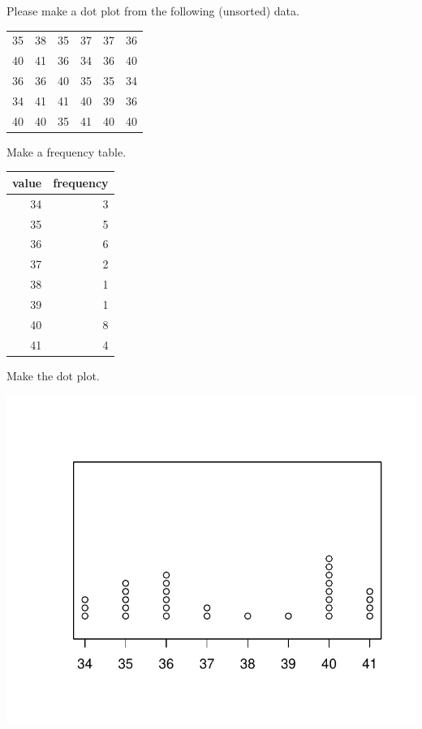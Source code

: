 
\begin{question}
Please make a dot plot from the following (unsorted) data.

\begin{longtable}[]{@{}rrrrrr@{}}
\toprule
35 & 38 & 35 & 37 & 37 & 36\tabularnewline
40 & 41 & 36 & 34 & 36 & 40\tabularnewline
36 & 36 & 40 & 35 & 35 & 34\tabularnewline
34 & 41 & 41 & 40 & 39 & 36\tabularnewline
40 & 40 & 35 & 41 & 40 & 40\tabularnewline
\bottomrule
\end{longtable}
\end{question}

\begin{solution}
Make a frequency table.

\begin{longtable}[]{@{}rr@{}}
\toprule
value & frequency\tabularnewline
\midrule
\endhead
34 & 3\tabularnewline
35 & 5\tabularnewline
36 & 6\tabularnewline
37 & 2\tabularnewline
38 & 1\tabularnewline
39 & 1\tabularnewline
40 & 8\tabularnewline
41 & 4\tabularnewline
\bottomrule
\end{longtable}

Make the dot plot.

\includegraphics{hist-1.pdf}\\
\end{solution}

